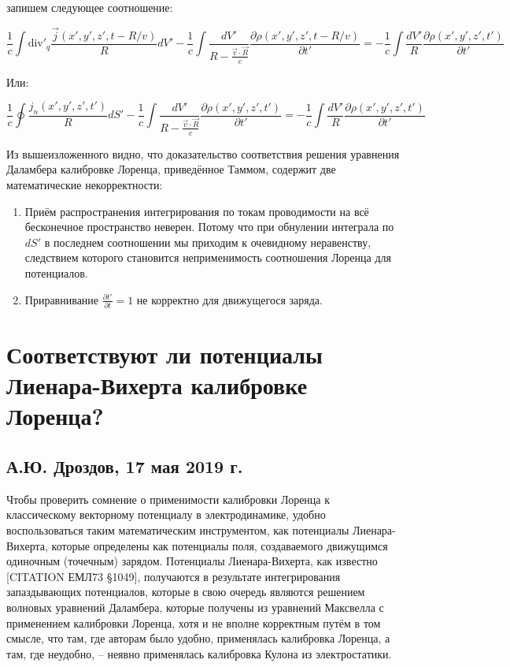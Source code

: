 \documentclass[12pt, a4paper]{article}
\begin{document}
запишем следующее соотношение:

\begin{equation}
\frac{1}{c} \int \text{div}'_q \frac{\vec{j}(x', y', z', t - R/v)}{R} dV' - \frac{1}{c} \int \frac{dV'}{R - \frac{\vec{v} \cdot \vec{R}}{c}} \frac{\partial \rho(x', y', z', t - R/v)}{\partial t'} = -\frac{1}{c} \int \frac{dV'}{R} \frac{\partial \rho(x', y', z', t')}{\partial t'}
\label{eq:lorentz_relation}
\end{equation}

Или:

\begin{equation}
\frac{1}{c} \oint \frac{j_n(x', y', z', t')}{R} dS' - \frac{1}{c} \int \frac{dV'}{R - \frac{\vec{v} \cdot \vec{R}}{c}} \frac{\partial \rho(x', y', z', t')}{\partial t'} = -\frac{1}{c} \int \frac{dV'}{R} \frac{\partial \rho(x', y', z', t')}{\partial t'}
\label{eq:lorentz_final}
\end{equation}

Из вышеизложенного видно, что доказательство соответствия решения уравнения Даламбера калибровке Лоренца, приведённое Таммом, содержит две математические некорректности:

\begin{enumerate}
    \item Приём распространения интегрирования по токам проводимости на всё бесконечное пространство неверен. Потому что при обнулении интеграла по $dS'$ в последнем соотношении мы приходим к очевидному неравенству, следствием которого становится неприменимость соотношения Лоренца для потенциалов.
    \item Приравнивание $\frac{\partial t'}{\partial t} = 1$ не корректно для движущегося заряда.
\end{enumerate}

\section{Соответствуют ли потенциалы Лиенара-Вихерта калибровке Лоренца?}
\label{sec:work04}

\subsection*{А.Ю. Дроздов, 17 мая 2019 г.}

Чтобы проверить сомнение о применимости калибровки Лоренца к классическому векторному потенциалу в электродинамике, удобно воспользоваться таким математическим инструментом, как потенциалы Лиенара-Вихерта, которые определены как потенциалы поля, создаваемого движущимся одиночным (точечным) зарядом. Потенциалы Лиенара-Вихерта, как известно [CITATION ЕМЛ73 §1049], получаются в результате интегрирования запаздывающих потенциалов, которые в свою очередь являются решением волновых уравнений Даламбера, которые получены из уравнений Максвелла с применением калибровки Лоренца, хотя и не вполне корректным путём в том смысле, что там, где авторам было удобно, применялась калибровка Лоренца, а там, где неудобно, -- неявно применялась калибровка Кулона из электростатики.
\end{document}
